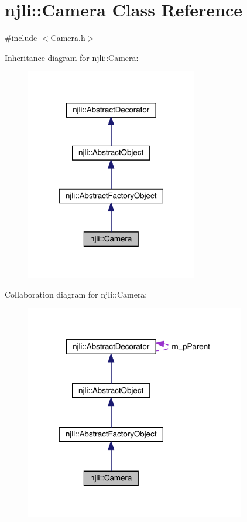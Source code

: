 \hypertarget{classnjli_1_1_camera}{}\section{njli\+:\+:Camera Class Reference}
\label{classnjli_1_1_camera}


{\ttfamily \#include $<$Camera.\+h$>$}



Inheritance diagram for njli\+:\+:Camera\+:\nopagebreak
\begin{figure}[H]
\begin{center}
\leavevmode
\includegraphics[width=213pt]{classnjli_1_1_camera__inherit__graph}
\end{center}
\end{figure}


Collaboration diagram for njli\+:\+:Camera\+:\nopagebreak
\begin{figure}[H]
\begin{center}
\leavevmode
\includegraphics[width=273pt]{classnjli_1_1_camera__coll__graph}
\end{center}
\end{figure}
